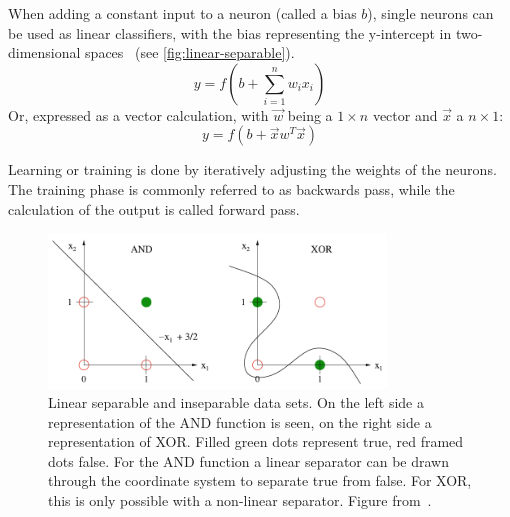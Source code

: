When adding a constant input to a neuron (called a bias $b$), single neurons can be used as linear classifiers, with the bias representing the y-intercept in two-dimensional spaces~\autocite{Ertel2017} (see \autoref{fig:linear-separable}).
\begin{equation}
    y = f(b + \sum^n_{i=1}w_ix_i)
    \label{eq:single-neuron-bias}
\end{equation}
Or, expressed as a vector calculation, with $\vec{w}$ being a $1 \times n$ vector and $\vec{x}$ a $n \times 1$:
\begin{equation}
    y = f(b + \vec{x}w^T \vec{x})
    \label{eq:single-neuron-vector-bias}
\end{equation}


Learning or training is done by iteratively adjusting the weights of the neurons.
The training phase is commonly referred to as backwards pass, while the calculation of the output is called forward pass.


\begin{figure}[!htb]
    \centering
    \includegraphics[width=0.8\textwidth]{pictures/linear-separable}
    \caption[Linear separable and inseparable data sets]{Linear separable and inseparable data sets. On the left side a representation of the AND function is seen, on the right side a representation of XOR. Filled green dots represent true, red framed dots false. 
    For the AND function a linear separator can be drawn through the coordinate system to separate true from false. For XOR, this is only possible with a non-linear separator. Figure from~\autocite{Ertel2017}.}
    \label{fig:linear-separable}
\end{figure}

